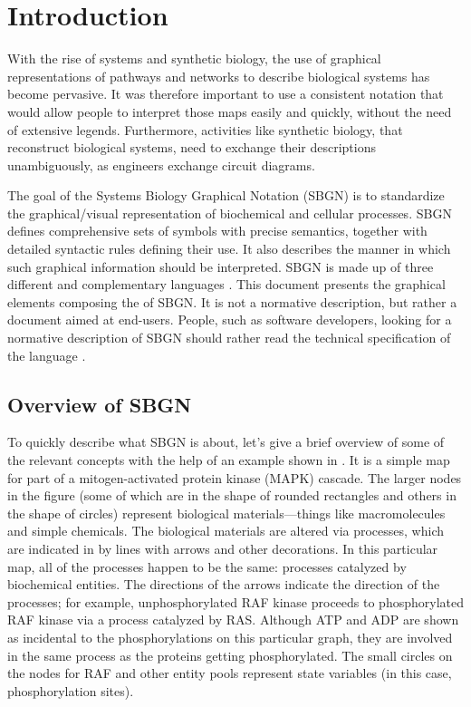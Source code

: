 

\chapter{Introduction}

With the rise of systems and synthetic biology, the use of graphical representations of pathways and networks to describe biological systems has become pervasive. It was therefore important to use a consistent notation that would allow people to interpret those maps easily and quickly, without the need of extensive legends. Furthermore, activities like synthetic biology, that reconstruct biological systems, need to exchange their descriptions unambiguously, as engineers exchange circuit diagrams. 

The goal of the Systems Biology Graphical Notation (SBGN) is to standardize the graphical/visual representation of biochemical and cellular processes. SBGN defines comprehensive sets of symbols with precise semantics, together with 
detailed syntactic rules defining their use.  It also describes the manner in which such graphical information should be interpreted. SBGN is made up of three different and complementary languages \cite{LeNovere:2009p1}. This document presents the graphical elements composing the \emph{\PDl{}} of SBGN. It is not a normative description, but rather a document aimed at end-users. People, such as software developers, looking for a normative description of SBGN \PDs should rather read the technical specification of the language \cite{Moodie2011}.

\section{Overview of SBGN \PDs}
\label{sec:PD-overview}

To quickly describe what SBGN \PDl is about, let's give a brief overview of some of the relevant concepts with the help of an example shown in . It is a simple map for part of a mitogen-activated protein kinase (MAPK) cascade.  The larger nodes in the figure (some of which are in the shape of rounded rectangles and others in the shape of circles) represent biological materials---things like macromolecules and simple chemicals.  The biological materials are altered via processes, which are indicated in \PDl by lines with arrows and other decorations.  In this particular map, all of the processes happen to be the same: processes catalyzed by biochemical entities.  The directions of the arrows indicate the direction of the processes; for example, unphosphorylated RAF kinase proceeds to phosphorylated RAF kinase via a process catalyzed by RAS. Although ATP and ADP are shown as incidental to the phosphorylations on this particular graph, they are involved in the same process as the proteins getting phosphorylated. The small circles on the nodes for RAF and other entity pools represent state variables (in this case, phosphorylation sites). 

